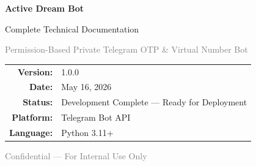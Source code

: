 \documentclass[12pt, a4paper]{report}
\begin{document}
\begin{titlepage}
\centering
\vspace*{2cm}

{\Huge\bfseries\textcolor{telegramblue}{Active Dream Bot}\par}
\vspace{0.5cm}
{\Large\textcolor{sectioncolor}{Complete Technical Documentation}\par}
\vspace{0.3cm}
{\large\textcolor{gray}{Permission-Based Private Telegram OTP \& Virtual Number Bot}\par}

\vspace{2cm}


\vspace{2cm}

\begin{tabular}{rl}
    \textbf{Version:} & 1.0.0 \\
    \textbf{Date:} & May 16, 2026 \\
    \textbf{Status:} & Development Complete --- Ready for Deployment \\
    \textbf{Platform:} & Telegram Bot API \\
    \textbf{Language:} & Python 3.11+ \\
\end{tabular}

\vfill
{\small\textcolor{gray}{Confidential --- For Internal Use Only}\par}
\end{titlepage}

\tableofcontents
\newpage







\end{document}
